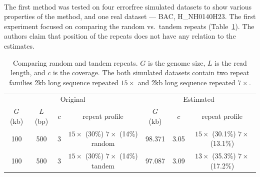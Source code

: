 \paragraph{}The first method\cite{waterman} was tested on four errorfree simulated datasets to show various properties of the method, and one real dataset --- BAC, H\_NH0140H23. The first experiment focused on comparing the random vs.\ tandem repeats (Table~\ref{tab:waterman1}). The authors claim that position of the repeats does not have any relation to the estimates.
\begin{table}[htbp]
\centering
\begin{tabular}{ccccccc}
\toprule
\multicolumn{4}{c}{Original} &
\multicolumn{3}{c}{Estimated} \\
\cmidrule(r{4pt}){1-4} \cmidrule(l){5-7}
$G$ (kb) & $L$ (bp) & $c$ & repeat profile & $G$ (kb) & $c$ & repeat profile\\
\midrule
100 & 500 & 3 & \specialcell[t]{$15\times$ (30\%) \\ $7\times$ (14\%) \\ random} & 98.371 & 3.05 & \specialcell[t]{$15\times$ (30.1\%) \\ $7\times$ (13.1\%)}\\
100 & 500 & 3 & \specialcell[t]{$15\times$ (30\%) \\ $7\times$ (14\%) \\ tandem} & 97.087 & 3.09 & \specialcell[t]{$13\times$ (35.3\%) \\ $7\times$ (17.2\%)}\\
\bottomrule
\end{tabular}
\caption[Comparing random and tandem repeats]{Comparing random and tandem repeats. $G$ is the genome size, $L$ is the read length, and $c$ is the coverage. The both simulated datasets contain two repeat families 2kb long sequence repeated $15\times$ and 2kb long sequence repeated $7\times$.\cite{waterman}}\label{tab:waterman1}
\end{table}

